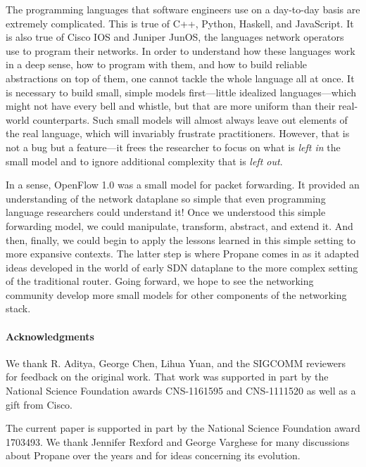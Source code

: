 \documentclass[sigconf]{acmart}
\newcommand{\para}[1]{\paragraph*{\textbf{#1}}}
\begin{document}
The programming languages that software engineers use on a day-to-day
basis are extremely complicated.  This is true of C++, Python, Haskell, and
JavaScript.  It is also true of Cisco IOS and Juniper JunOS, the
languages network operators use to program their networks.  In order to understand
how these languages work in a deep sense, how to program with them,
and how to build reliable abstractions on top of them, one cannot
tackle the whole language all at once.  It is necessary to build
small, simple models first---little idealized languages---which might
not have every bell and whistle, but that are more uniform than their
real-world counterparts.  Such
small models will almost always leave out elements of the
real language, which will invariably frustrate practitioners.
However, that is
not a bug  but a feature---it frees the researcher to focus on
what is \emph{left in} the small model and to ignore additional
complexity that is \emph{left out}.

In a sense, OpenFlow 1.0 was a small model for packet forwarding.  It
provided an understanding of the network dataplane so
simple that even programming language researchers could understand it!
Once we understood this simple forwarding model,
we could manipulate, transform, abstract, and extend it. And then, finally,
we could begin to apply the lessons learned in this simple setting to
more expansive contexts.  The
latter step is where Propane comes in as it adapted ideas developed in
the world of early SDN dataplane to the
more complex setting of the traditional router.  Going forward, we hope
to see the networking community develop more small models for other
components of the networking stack.

\para{Acknowledgments}
We thank R. Aditya, George Chen,  Lihua Yuan, and the SIGCOMM reviewers for feedback on the original
work. That work was supported in part by the National Science
Foundation awards CNS-1161595 and CNS-1111520 as well as a gift from
Cisco.

The current paper is supported in part by the National Science
Foundation award 1703493.  We thank Jennifer Rexford and George Varghese for
many discussions about Propane over the years and for ideas concerning its evolution.


\balance




\end{document}
